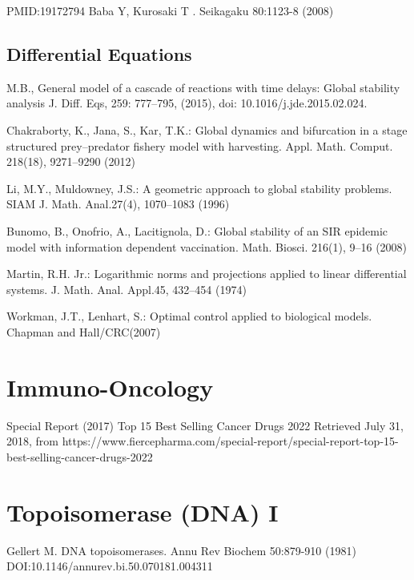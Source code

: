 \begin{thebibliography}{00}
PMID:19172794
 Baba Y, Kurosaki T
.
\newblock Seikagaku 80:1123-8 (2008)


\subsection{Differential Equations}

M.B., 
\newblock General model of a cascade of reactions with time delays: Global stability analysis
\newblock J. Diff. Eqs, 259: 777–795, (2015), doi: 10.1016/j.jde.2015.02.024.

Chakraborty, K., Jana, S., Kar, T.K.: 
\newblock Global dynamics and bifurcation in a stage structured prey–predator fishery model with harvesting. 
\newblock Appl. Math. Comput. 218(18), 9271–9290 (2012)

Li, M.Y., Muldowney, J.S.: 
\newblock A geometric approach to global stability problems. 
\newblock SIAM J. Math. Anal.27(4), 1070–1083 (1996)

Bunomo, B., Onofrio, A., Lacitignola, D.: 
\newblock Global stability of an SIR epidemic model with information dependent vaccination. 
\newblock Math. Biosci. 216(1), 9–16 (2008)

Martin,   R.H.   Jr.:   
\newblock Logarithmic   norms   and   projections   applied   to   linear   differential   systems.
\newblock J. Math. Anal. Appl.45, 432–454 (1974)

Workman,  J.T.,  Lenhart,  S.:  
\newblock Optimal  control  applied  to  biological  models.  
\newblock Chapman  and  Hall/CRC(2007)


\section{Immuno-Oncology}

Special Report (2017)
\newblock Top 15 Best Selling Cancer Drugs 2022
\newblock Retrieved July 31, 2018, from https://www.fiercepharma.com/special-report/special-report-top-15-best-selling-cancer-drugs-2022

\section{Topoisomerase (DNA) I}

Gellert M.
\newblock DNA topoisomerases.
\newblock Annu Rev Biochem 50:879-910 (1981) DOI:10.1146/annurev.bi.50.070181.004311


\end{thebibliography}
